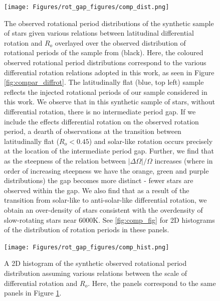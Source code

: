 \begin{figure}
\centering
    \texttt{[image: Figures/rot\_gap\_figures/comp\_dist.png]}
    \caption{
    	The observed rotational period distributions of the synthetic sample of stars given various relations between latitudinal differential rotation and $R_o$ overlayed over the observed distribution of rotational periods of the \kepler{} sample from \citet{mcquillan_2014} (black). Here, the coloured observed rotational period distributions correspond to the various differential rotation relations adopted in this work, as seen in Figure \ref{fig:compar_diffrot}. The latitudinally flat (blue, top left) sample reflects the injected rotational periods of our sample considered in this work. We observe that in this synthetic sample of stars, without differential rotation, there is no intermediate period gap. If we include the effects differential rotation on the observed rotation period, a dearth of observations at the transition between latitudinally flat ($R_o<0.45$) and solar-like rotation occurs precisely at the location of the intermediate period gap. 
 Further, we find that as the steepness of the relation between $|\Delta \Omega|/\Omega$ increases (where in order of increasing steepness we have the orange, green and purple distributions) the gap becomes more distinct - fewer stars are observed within the gap. We also find that as a result of the transition from solar-like to anti-solar-like differential rotation, we obtain an over-density of stars consistent with the overdensity of slow-rotating stars near 6000K. See \ref{fig:comp_fig} for 2D histograms of the distribution of rotation periods in these panels.}
    \label{fig:comp_dist}
\end{figure}

\begin{figure}
\centering
    \texttt{[image: Figures/rot\_gap\_figures/comp\_hist.png]}
    \caption{
    	A 2D histogram of the synthetic observed rotational period distribution assuming various relations between the scale of differential rotation and $R_o$. Here, the panels correspond to the same panels in Figure \ref{fig:comp_dist}.}
    \label{fig:comp_hist}
\end{figure}




